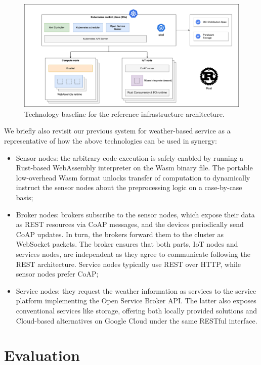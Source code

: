 \begin{figure}[ht]
\centering
\includegraphics[width=\columnwidth]{figures/architecture-technologies}
\caption{Technology baseline for the reference infrastructure architecture.} \label{fig:architecture-technologies}
\end{figure}

We briefly also revisit our previous system for weather-based service as a representative of how the above technologies can be used in synergy:

\begin{itemize}
    \item Sensor nodes: the arbitrary code execution is safely enabled by running a Rust-based WebAssembly interpreter on the Wasm binary file. The portable low-overhead Wasm format unlocks transfer of computation to dynamically instruct the sensor nodes about the preprocessing logic on a case-by-case basis;
    \item Broker nodes: brokers subscribe to the sensor nodes, which expose their data as REST resources via CoAP messages, and the devices periodically send CoAP updates. In turn, the brokers forward them to the cluster as WebSocket packets. The broker ensures that both parts, IoT nodes and services nodes, are independent as they agree to communicate following the REST architecture. Service nodes typically use REST over HTTP, while sensor nodes prefer CoAP;
    \item Service nodes: they request the weather information as services to the service platform implementing the Open Service Broker API. The latter also exposes conventional services like storage, offering both locally provided solutions and Cloud-based alternatives on Google Cloud under the same RESTful interface. 
\end{itemize}

\section{Evaluation}\label{sec:technology-selection}

